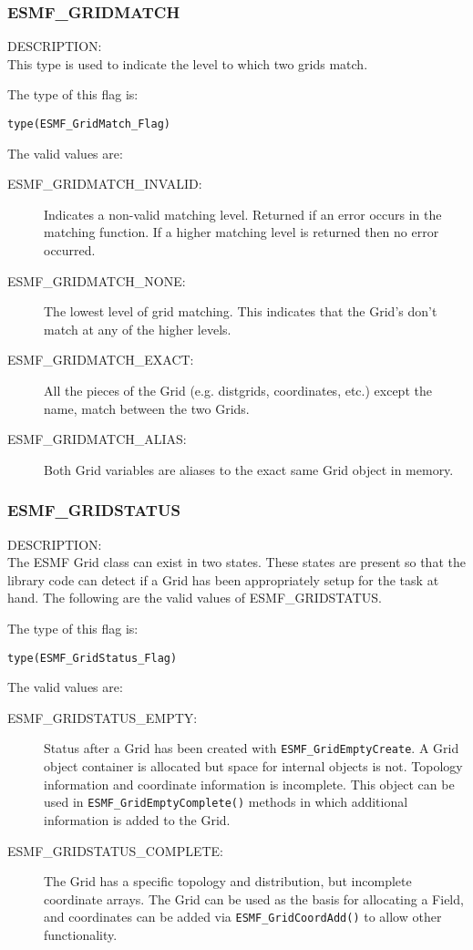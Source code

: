 \subsubsection{ESMF\_GRIDMATCH}
\label{const:gridmatch}

{\sf DESCRIPTION:\\}
 This type is used to indicate the level to which two grids match.

The type of this flag is:

{\tt type(ESMF\_GridMatch\_Flag)}

The valid values are:
\begin{description}
\item [ESMF\_GRIDMATCH\_INVALID:] Indicates a non-valid matching level. Returned
      if an error occurs in the matching function. If a higher matching level
      is returned then no error occurred.
\item [ESMF\_GRIDMATCH\_NONE:] The lowest level of grid matching. 
      This indicates that the Grid's don't match at any of the higher levels. 
\item [ESMF\_GRIDMATCH\_EXACT:] All the pieces of the Grid (e.g. distgrids, 
      coordinates, etc.) except the name, match between the two Grids. 
\item [ESMF\_GRIDMATCH\_ALIAS:] Both Grid variables are aliases to the exact
      same Grid object in memory. 
\end{description}


\subsubsection{ESMF\_GRIDSTATUS}
\label{const:gridstatus}

{\sf DESCRIPTION:\\}
The ESMF Grid class can exist in two states. These states are
present so that the library code can detect if a Grid has been
appropriately setup for the task at hand. The following
are the valid values of ESMF\_GRIDSTATUS.

The type of this flag is:

{\tt type(ESMF\_GridStatus\_Flag)}

The valid values are:
\begin{description}
\item [ESMF\_GRIDSTATUS\_EMPTY:] Status after a Grid has been created with 
      {\tt ESMF\_GridEmptyCreate}.  A Grid object container is allocated but
      space for internal objects is not.  Topology information and coordinate
      information is incomplete.  This object can be used in {\tt ESMF\_GridEmptyComplete()}
      methods in which additional information is added to the Grid.
\item [ESMF\_GRIDSTATUS\_COMPLETE:] The Grid has a specific topology and
      distribution, but incomplete coordinate arrays.  The Grid can be used
      as the basis for allocating a Field, and coordinates can be added
      via {\tt ESMF\_GridCoordAdd()} to allow other functionality. 
\end{description}


